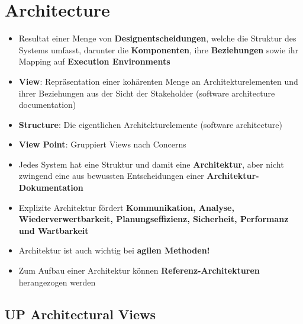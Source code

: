 \section{Architecture}
\label{arch:sec:architecture}

\begin{itemize}
	\item Resultat einer Menge von \textbf{Designentscheidungen}, welche die Struktur des Systems umfasst, darunter die \textbf{Komponenten}, ihre \textbf{Beziehungen} sowie ihr Mapping auf \textbf{Execution Environments}
	\item \textbf{View}: Repräsentation einer kohärenten Menge an Architekturelementen und ihrer Beziehungen aus der Sicht der Stakeholder (software architecture documentation)
	\item \textbf{Structure}: Die eigentlichen Architekturelemente (software architecture)
	\item \textbf{View Point}: Gruppiert Views nach Concerns
	\item Jedes System hat eine Struktur und damit eine \textbf{Architektur}, aber nicht zwingend eine aus bewussten Entscheidungen einer \textbf{Architektur-Dokumentation}
	\item Explizite Architektur fördert \textbf{Kommunikation, Analyse, Wiederverwertbarkeit, Planungseffizienz, Sicherheit, Performanz und Wartbarkeit}
	\item Architektur ist auch wichtig bei \textbf{agilen Methoden!}
	\item Zum Aufbau einer Architektur können \textbf{Referenz-Architekturen} herangezogen werden
\end{itemize}

\subsection{UP Architectural Views}
\label{arch:sub:up_architectural_views}

